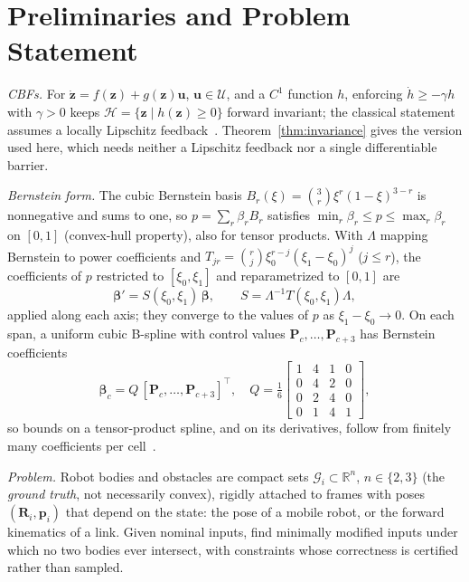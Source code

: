 \documentclass[journal]{IEEEtran}
\theoremstyle{definition}
\newcommand{\R}{\mathbb{R}}
\newcommand{\Rot}{\mathbf{R}}
\begin{document}
\section{Preliminaries and Problem Statement}\label{sec:prelim}

\emph{CBFs.} For $\dot{\mathbf z}=f(\mathbf z)+g(\mathbf z)\mathbf u$, $\mathbf u\in\mathcal U$, and a
$C^1$ function $h$, enforcing $\dot h\ge-\gamma h$ with $\gamma>0$ keeps
$\mathcal H=\{\mathbf z\mid h(\mathbf z)\ge0\}$ forward invariant; the classical statement assumes a
locally Lipschitz feedback~\cite{ames2019cbf}. Theorem~\ref{thm:invariance} gives the version used
here, which needs neither a Lipschitz feedback nor a single differentiable barrier.

\emph{Bernstein form.} The cubic Bernstein basis $B_r(\xi)=\binom3r\xi^r(1-\xi)^{3-r}$ is
nonnegative and sums to one, so $p=\sum_r\beta_rB_r$ satisfies $\min_r\beta_r\le p\le\max_r\beta_r$
on $[0,1]$ (convex-hull property), also for tensor products. With $\Lambda$ mapping Bernstein to power
coefficients and $T_{jr}=\binom rj\xi_0^{r-j}(\xi_1-\xi_0)^j$ ($j\le r$), the coefficients of $p$
restricted to $[\xi_0,\xi_1]$ and reparametrized to $[0,1]$ are
\begin{equation}\label{eq:subdiv}
\boldsymbol\beta'=S(\xi_0,\xi_1)\,\boldsymbol\beta,\qquad S=\Lambda^{-1}T(\xi_0,\xi_1)\Lambda,
\end{equation}
applied along each axis; they converge to the values of $p$ as $\xi_1-\xi_0\to0$. On each span, a uniform
cubic B-spline with control values $\mathbf P_c,\dots,\mathbf P_{c+3}$ has Bernstein coefficients
\begin{equation}\label{eq:b2b}
\boldsymbol\beta_c=Q\,[\mathbf P_{c},\dots,\mathbf P_{c+3}]^{\top},\quad
Q=\tfrac16\left[\begin{smallmatrix}1&4&1&0\\0&4&2&0\\0&2&4&0\\0&1&4&1\end{smallmatrix}\right],
\end{equation}
so bounds on a tensor-product spline, and on its derivatives, follow from finitely many
coefficients per cell~\cite{farin2002curves,jo2027semantic}.

\emph{Problem.} Robot bodies and obstacles are compact sets $\mathcal G_i\subset\R^n$, $n\in\{2,3\}$
(the \emph{ground truth}, not necessarily convex), rigidly attached to frames with poses
$(\Rot_i,\mathbf p_i)$ that depend on the state: the pose of a mobile robot, or the forward
kinematics of a link. Given nominal inputs, find minimally modified inputs under which no two
bodies ever intersect, with constraints whose correctness is certified rather than sampled.
\end{document}
